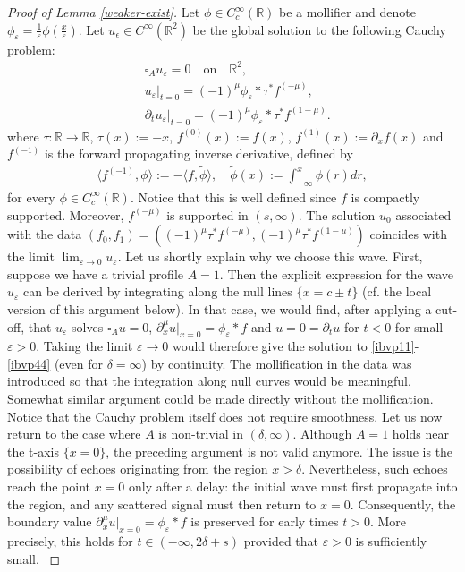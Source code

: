 \documentclass[10pt,a4paper]{article}
\theoremstyle{plain}
\theoremstyle{definition}
\theoremstyle{remark}
\numberwithin{equation}{section}
\newcommand{\R}{\mathbb{R}}
\begin{document}
\begin{proof}[Proof of Lemma \ref{weaker-exist}]
Let $\phi \in C^\infty_c( \R) $ be a mollifier and denote $\phi_\varepsilon =  \frac{1}{\varepsilon} \phi \left( \frac{x}{\varepsilon} \right)$. 
 Let $u_\epsilon   \in C^\infty(\R^2)$ be the {global} solution to the following Cauchy problem:
 \begin{align}
&\square_A u_\varepsilon = 0 \quad \text{on} \quad \R^2, \label{cauchy1} \\
& u_\varepsilon |_{t=0}  = (-1)^\mu \phi_\varepsilon *   \tau^* f^{(-\mu)} , \\  
&\partial_t u_\varepsilon  |_{t=0} =  (-1)^\mu \phi_\varepsilon *  \tau^*  f^{(1-\mu)} . \label{cauchy3}
\end{align} 
where $\tau : \R \to \R$, $\tau (x) := -x$, $f^{(0)} (x) := f(x) $, $f^{(1)} (x):= \partial_x f(x) $ and $f^{(-1)}$ is the forward propagating inverse derivative, defined by
\begin{align}
\langle f^{(-1)}, \phi \rangle  := 
-\langle f, \tilde\phi  \rangle, \quad  
   \tilde\phi(x) := \int_{-\infty}^{x } \phi(r) dr  ,
\end{align}
for every $\phi \in C_c^\infty(\R)$. 
Notice that this is well defined since $f$ is compactly supported. Moreover, $f^{(-\mu)} $ is supported in $(s,\infty)$.
%
The solution $u_0$ associated with the data $(f_0,f_1) = ((-1)^\mu\tau^*f^{(-\mu)}, (-1)^\mu \tau^*f^{(1-\mu)})$ coincides with the limit $  \lim_{\varepsilon \to 0} u_\varepsilon$.
{ Let us shortly explain why we choose this wave. First, suppose  we have a trivial profile $A=1$. Then the explicit expression for  the wave $u_\varepsilon$ can be derived by integrating along the null lines $\{ x = c\pm t\}$   (cf. the local version of this argument below). In that case, we would find, after applying a cut-off, that $u_\varepsilon$ solves $\square_A u = 0$, $\partial^\mu_x u |_{x=0} = \phi_\varepsilon * f$ and 
$u = 0 = \partial_t u$ for $t<0$ for small $\varepsilon>0$.  
Taking the limit $\varepsilon \to 0$ would therefore give the solution to \eqref{ibvp11}-\eqref{ibvp44} (even for $\delta= \infty $) by continuity. The mollification
 in the data was introduced so that the integration along null curves would be meaningful.  
Somewhat similar argument could be made  directly without the mollification. 
 Notice that the Cauchy problem itself  does not require smoothness. 
Let us now return to the case where $A$ is non-trivial in $(\delta, \infty)$. 
Although $A=1$ holds near the t-axis $\{x = 0\}$, the preceding argument is not valid anymore. The issue is the possibility of echoes originating from the region $x>\delta$. 
Nevertheless, such echoes reach the point $x=0$ only after a delay: the initial wave must first
propagate into the region, and any scattered signal must then return to $x=0$.
Consequently, the boundary value $\partial^\mu_x u |_{x=0} = \phi_\varepsilon * f$ is preserved for early times $t>0$. More precisely, this holds for  $t \in (-\infty,2\delta +s)$ provided that $\varepsilon>0$ is sufficiently small. 
}


\end{proof}
\end{document}
